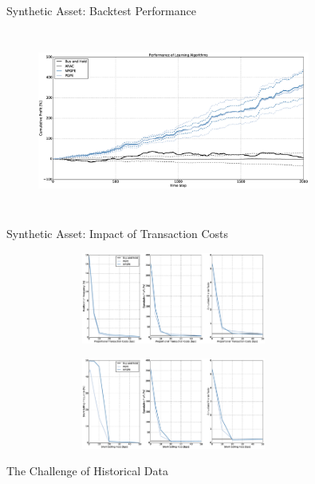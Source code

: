 \begin{frame}[c]{Synthetic Asset: Backtest Performance}
\begin{figure}[t]
	\centering
	\includegraphics[height=6cm,width=0.8\textwidth]{Images/6_1_single_synthetic_neutral_performance}
\end{figure}
\end{frame}

\begin{frame}[c]{Synthetic Asset: Impact of Transaction Costs}
\begin{figure}[t!]
	\centering
	\includegraphics[height=3cm,width=0.8\textwidth]{Images/6_2_impact_transaction_costs}
\end{figure}
\begin{figure}[t!]
	\centering
	\includegraphics[height=3cm,width=0.8\textwidth]{Images/6_3_impact_short_selling_fees}
\end{figure}
\end{frame}

\begin{frame}{The Challenge of Historical Data}

\end{frame}

